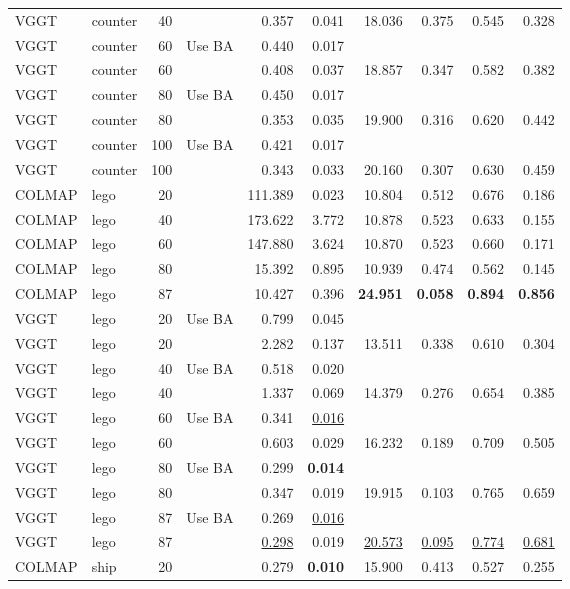 \begin{table}[H]
\begin{tabular}{llrlrrrrrr}
VGGT & counter & 40 &  & 0.357 & 0.041 & 18.036 & 0.375 & 0.545 & 0.328 \\
VGGT & counter & 60 & Use BA & 0.440 & 0.017 &  &  &  &  \\
VGGT & counter & 60 &  & 0.408 & 0.037 & 18.857 & 0.347 & 0.582 & 0.382 \\
VGGT & counter & 80 & Use BA & 0.450 & 0.017 &  &  &  &  \\
VGGT & counter & 80 &  & 0.353 & 0.035 & 19.900 & 0.316 & 0.620 & 0.442 \\
VGGT & counter & 100 & Use BA & 0.421 & 0.017 &  &  &  &  \\
VGGT & counter & 100 &  & 0.343 & 0.033 & 20.160 & 0.307 & 0.630 & 0.459 \\
\midrule
COLMAP & lego & 20 &  & 111.389 & 0.023 & 10.804 & 0.512 & 0.676 & 0.186 \\
COLMAP & lego & 40 &  & 173.622 & 3.772 & 10.878 & 0.523 & 0.633 & 0.155 \\
COLMAP & lego & 60 &  & 147.880 & 3.624 & 10.870 & 0.523 & 0.660 & 0.171 \\
COLMAP & lego & 80 &  & 15.392 & 0.895 & 10.939 & 0.474 & 0.562 & 0.145 \\
COLMAP & lego & 87 &  & 10.427 & 0.396 & \textbf{24.951} & \textbf{0.058} & \textbf{0.894} & \textbf{0.856} \\
VGGT & lego & 20 & Use BA & 0.799 & 0.045 &  &  &  &  \\
VGGT & lego & 20 &  & 2.282 & 0.137 & 13.511 & 0.338 & 0.610 & 0.304 \\
VGGT & lego & 40 & Use BA & 0.518 & 0.020 &  &  &  &  \\
VGGT & lego & 40 &  & 1.337 & 0.069 & 14.379 & 0.276 & 0.654 & 0.385 \\
VGGT & lego & 60 & Use BA & 0.341 & \underline{0.016} &  &  &  &  \\
VGGT & lego & 60 &  & 0.603 & 0.029 & 16.232 & 0.189 & 0.709 & 0.505 \\
VGGT & lego & 80 & Use BA & 0.299 & \textbf{0.014} &  &  &  &  \\
VGGT & lego & 80 &  & 0.347 & 0.019 & 19.915 & 0.103 & 0.765 & 0.659 \\
VGGT & lego & 87 & Use BA & 0.269 & \underline{0.016} &  &  &  &  \\
VGGT & lego & 87 &  & \underline{0.298} & 0.019 & \underline{20.573} & \underline{0.095} & \underline{0.774} & \underline{0.681} \\
\midrule
COLMAP & ship & 20 &  & 0.279 & \textbf{0.010} & 15.900 & 0.413 & 0.527 & 0.255 \\

\end{tabular}
\end{table}
